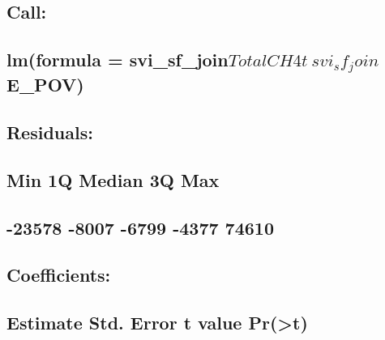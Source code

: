 \documentclass[
  12pt,
]{article}
\begin{document}
\hypertarget{call-5}{%
\subsection{Call:}\label{call-5}}

\hypertarget{lmformula-svi_sf_jointotalch4t-svi_sf_joine_pov}{%
\subsection{\texorpdfstring{lm(formula =
svi\_sf\_join\(TotalCH4t ~ svi_sf_join\)E\_POV)}{lm(formula = svi\_sf\_joinTotalCH4t \textasciitilde{} svi\_sf\_joinE\_POV)}}\label{lmformula-svi_sf_jointotalch4t-svi_sf_joine_pov}}

\hypertarget{section-55}{%
\subsection{}\label{section-55}}

\hypertarget{residuals-5}{%
\subsection{Residuals:}\label{residuals-5}}

\hypertarget{min-1q-median-3q-max-5}{%
\subsection{Min 1Q Median 3Q Max}\label{min-1q-median-3q-max-5}}

\hypertarget{section-56}{%
\subsection{-23578 -8007 -6799 -4377 74610}\label{section-56}}

\hypertarget{section-57}{%
\subsection{}\label{section-57}}

\hypertarget{coefficients-5}{%
\subsection{Coefficients:}\label{coefficients-5}}

\hypertarget{estimate-std.-error-t-value-prt-5}{%
\subsection{Estimate Std. Error t value
Pr(\textgreater\textbar t\textbar)}\label{estimate-std.-error-t-value-prt-5}}
\end{document}
